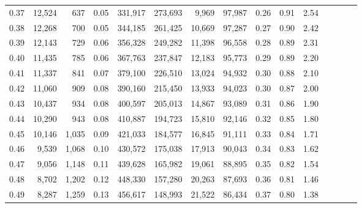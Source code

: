 \begin{tabular}{rrrcrrrrrrrrrrr}
0.37 &  12,524 &    637 &                                       0.05 &  331,917 &  273,693 &    9,969 &   97,987 &  0.26 &  0.91 &                         2.54 \\
0.38 &  12,268 &    700 &                                       0.05 &  344,185 &  261,425 &   10,669 &   97,287 &  0.27 &  0.90 &                         2.42 \\
0.39 &  12,143 &    729 &                                       0.06 &  356,328 &  249,282 &   11,398 &   96,558 &  0.28 &  0.89 &                         2.31 \\
0.40 &  11,435 &    785 &                                       0.06 &  367,763 &  237,847 &   12,183 &   95,773 &  0.29 &  0.89 &                         2.20 \\
0.41 &  11,337 &    841 &                                       0.07 &  379,100 &  226,510 &   13,024 &   94,932 &  0.30 &  0.88 &                         2.10 \\
0.42 &  11,060 &    909 &                                       0.08 &  390,160 &  215,450 &   13,933 &   94,023 &  0.30 &  0.87 &                         2.00 \\
0.43 &  10,437 &    934 &                                       0.08 &  400,597 &  205,013 &   14,867 &   93,089 &  0.31 &  0.86 &                         1.90 \\
0.44 &  10,290 &    943 &                                       0.08 &  410,887 &  194,723 &   15,810 &   92,146 &  0.32 &  0.85 &                         1.80 \\
0.45 &  10,146 &  1,035 &                                       0.09 &  421,033 &  184,577 &   16,845 &   91,111 &  0.33 &  0.84 &                         1.71 \\
0.46 &   9,539 &  1,068 &                                       0.10 &  430,572 &  175,038 &   17,913 &   90,043 &  0.34 &  0.83 &                         1.62 \\
0.47 &   9,056 &  1,148 &                                       0.11 &  439,628 &  165,982 &   19,061 &   88,895 &  0.35 &  0.82 &                         1.54 \\
0.48 &   8,702 &  1,202 &                                       0.12 &  448,330 &  157,280 &   20,263 &   87,693 &  0.36 &  0.81 &                         1.46 \\
0.49 &   8,287 &  1,259 &                                       0.13 &  456,617 &  148,993 &   21,522 &   86,434 &  0.37 &  0.80 &                         1.38 \\

\end{tabular}
